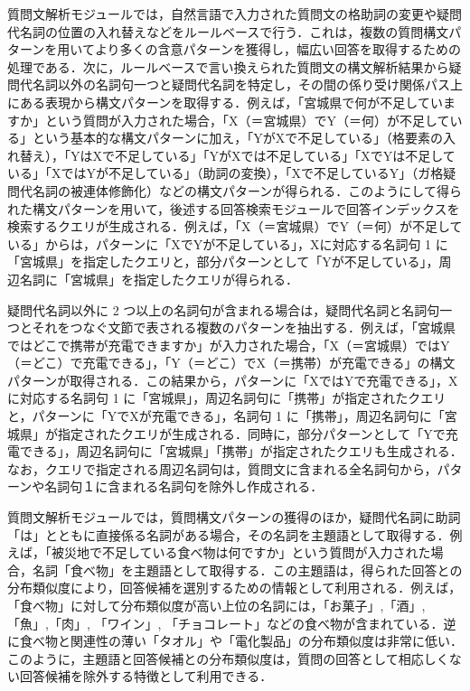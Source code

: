 \documentclass[japanese]{jnlp_1.4}
\begin{document}
質問文解析モジュールでは，自然言語で入力された質問文の格助詞の変更や疑問代名詞の位置の入れ替えなどをルールベースで行う．これは，複数の質問構文パターンを用いてより多くの含意パターンを獲得し，幅広い回答を取得するための処理である．次に，ルールベースで言い換えられた質問文の構文解析結果から疑問代名詞以外の名詞句一つと疑問代名詞を特定し，その間の係り受け関係パス上にある表現から構文パターンを取得する．例えば，「宮城県で何が不足していますか」という質問が入力された場合，「X（＝宮城県）でY（＝何）が不足している」という基本的な構文パターンに加え，「YがXで不足している」（格要素の入れ替え），「YはXで不足している」「YがXでは不足している」「XでYは不足している」「XではYが不足している」（助詞の変換），「Xで不足しているY」（ガ格疑問代名詞の被連体修飾化）などの構文パターンが得られる．このようにして得られた構文パターンを用いて，後述する回答検索モジュールで回答インデックスを検索するクエリが生成される．例えば，「X（＝宮城県）でY（＝何）が不足している」からは，パターンに「XでYが不足している」，Xに対応する名詞句 1 に「宮城県」を指定したクエリと，部分パターンとして「Yが不足している」，周辺名詞に「宮城県」を指定したクエリが得られる．

疑問代名詞以外に 2 つ以上の名詞句が含まれる場合は，疑問代名詞と名詞句一つとそれをつなぐ文節で表される複数のパターンを抽出する．例えば，「宮城県ではどこで携帯が充電できますか」が入力された場合，「X（＝宮城県）ではY（＝どこ）で充電できる」，「Y（＝どこ）でX（＝携帯）が充電できる」の構文パターンが取得される．この結果から，パターンに「XではYで充電できる」，Xに対応する名詞句 1 に「宮城県」，周辺名詞句に「携帯」が指定されたクエリと，パターンに「YでXが充電できる」，名詞句 1 に「携帯」，周辺名詞句に「宮城県」が指定されたクエリが生成される．同時に，部分パターンとして「Yで充電できる」，周辺名詞句に「宮城県」「携帯」が指定されたクエリも生成される．なお，クエリで指定される周辺名詞句は，質問文に含まれる全名詞句から，パターンや名詞句１に含まれる名詞句を除外し作成される．

質問文解析モジュールでは，質問構文パターンの獲得のほか，疑問代名詞に助詞「は」とともに直接係る名詞がある場合，その名詞を主題語として取得する．例えば，「被災地で不足している食べ物は何ですか」という質問が入力された場合，名詞「食べ物」を主題語として取得する．この主題語は，得られた回答との分布類似度\cite{Kazama2008}により，回答候補を選別するための情報として利用される．例えば，「食べ物」に対して分布類似度が高い上位の名詞には，「お菓子」,「酒」, 「魚」,「肉」, 「ワイン」, 「チョコレート」などの食べ物が含まれている．逆に食べ物と関連性の薄い「タオル」や「電化製品」の分布類似度は非常に低い．このように，主題語と回答候補との分布類似度は，質問の回答として相応しくない回答候補を除外する特徴として利用できる．
\end{document}

